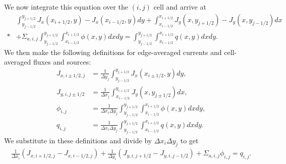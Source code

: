 We now integrate this equation over the $(i,j)$ cell and arrive at
\begin{align}
    &\int_{y_{j-1/2}}^{y_{j+1/2}} J_x(x_{i+1/2},y) - J_x(x_{i-1/2},y) dy
  +  \int_{x_{i-1/2}}^{x_{i+1/2}} J_y(x,y_{j+1/2}) - J_y(x,y_{j-1/2}) dx \nonumber \\*
  &+ \Sigma_{a,i,j} \int_{y_{j-1/2}}^{y_{j+1/2}} \int_{x_{i-1/2}}^{x_{i+1/2}}  \phi(x,y) dx dy
  = \int_{y_{j-1/2}}^{y_{j+1/2}} \int_{x_{i-1/2}}^{x_{i+1/2}} q(x,y) dx dy .
\end{align}
We then make the following definitions for edge-averaged currents and cell-averaged fluxes and sources:
\begin{subequations}
\begin{align}
  J_{x,{i \pm 1/2},j} &= \frac{1}{\Delta y_j} \int_{y_{j-1/2}}^{y_{j+1/2}} J_x(x_{i \pm 1/2},y) dy , \\
  J_{y,i,{j \pm 1/2}} &= \frac{1}{\Delta x_j} \int_{x_{i-1/2}}^{y_{i+1/2}} J_y(x,y_{j \pm 1/2}) dx , \\ 
  \phi_{i,j} &= \frac{1}{ \Delta x_i \Delta y_j } \int_{y_{j-1/2}}^{y_{j+1/2}} \int_{x_{i-1/2}}^{x_{i+1/2}}  \phi(x,y) dx dy , \\
  q_{i,j} &= \frac{1}{ \Delta x_i \Delta y_j } \int_{y_{j-1/2}}^{y_{j+1/2}} \int_{x_{i-1/2}}^{x_{i+1/2}}  q(x,y) dx dy .
\end{align}
\end{subequations}
We substitute in these definitions and divide by $\Delta x_i \Delta y_j$ to get
\begin{align}
    \frac{1}{\Delta x_i} \left( J_{x,{i + 1/2},j} - J_{x,{i - 1/2},j} \right)
  + \frac{1}{\Delta y_i} \left( J_{y,i,{j + 1/2}} - J_{y,i,{j - 1/2}} \right)
  + \Sigma_{a,i,j} \phi_{i,j} = q_{i,j} .
\end{align} 

